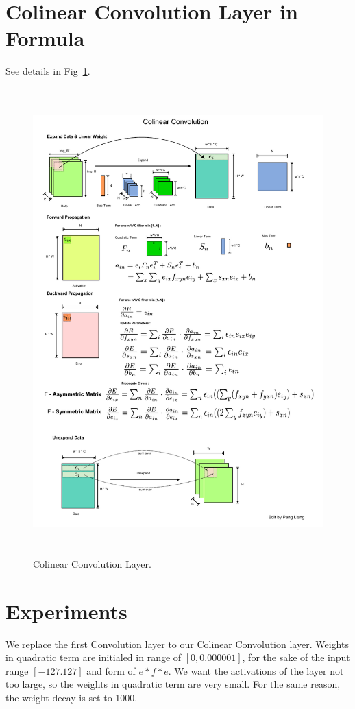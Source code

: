 \documentclass[12pt]{article}
\begin{document}
\section{Colinear Convolution Layer in Formula}
See details in Fig~\ref{fig:ccnn}.
\begin{figure}[!ht]
    \centering
    \includegraphics[height=18cm]{colinearcnn.pdf}
    \caption{\label{fig:ccnn} Colinear Convolution Layer.}
\end{figure}

\section{Experiments}
We replace the first Convolution layer to our Colinear Convolution layer. Weights in quadratic term are initialed in range of $[0,0.000001]$, for the sake of the input range $[-127. 127]$ and form of $e*f*e$. We want the activations of the layer not too large, so the weights in quadratic term are very small. For the same reason, the weight decay is set to 1000.
 
\end{document}
